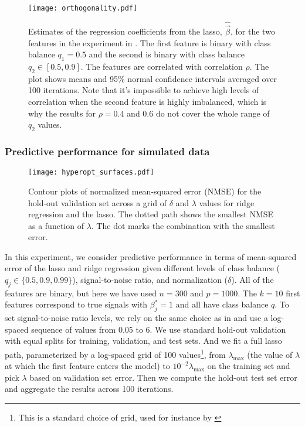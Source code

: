 \begin{figure}[htpb]
  \centering
  \texttt{[image: orthogonality.pdf]}
  \caption{%
    Estimates of the regression coefficients from the lasso,
    \(\hat{\vec{\beta}}\), for the two features in the experiment in
    . The first feature is binary with class
    balance \(q_1 = 0.5\) and the second is binary with class balance \(q_2 \in [0.5, 0.9]\).
    The features are correlated with correlation \(\rho\). The plot shows means and
    95\% normal confidence intervals averaged over 100 iterations. Note
    that it's impossible to achieve high levels of correlation when the second
    feature is highly imbalanced, which is why the results for \(\rho = 0.4\) and \(0.6\)
    do not cover the whole range of \(q_2\) values.
  }
  \label{fig:orthogonality}
\end{figure}

\subsubsection{Predictive performance for simulated data}%
\label{sec:predictive-performance-simulated}

\begin{figure}[htpb]
  \centering
  \texttt{[image: hyperopt\_surfaces.pdf]}
  \caption{%
    Contour plots of normalized mean-squared error (NMSE) for the hold-out validation set
    across a grid of \(\delta\) and \(\lambda\) values for ridge regression and the lasso. The
    dotted path shows the smallest NMSE as a function of \(\lambda\). The dot marks the
    combination with the smallest error.
  }
  \label{fig:hyperopt-contours-full}
\end{figure}

In this experiment, we consider predictive performance in terms of mean-squared error of
the lasso and ridge regression given different levels of class balance (\(q_j \in \{0.5,
0.9, 0.99\}\)), signal-to-noise ratio, and normalization (\(\delta\)). All of the features
are binary, but here we have used \(n=300\) and \(p = \num{1000}\). The \(k=10\) first
features correspond to true signals with \(\beta^*_j = 1\) and all have class balance
\(q\). To set signal-to-noise ratio levels, we rely on the same choice as in
\citet{hastie2020} and use a log-spaced sequence of values from 0.05 to 6. We use
standard hold-out validation with equal splits for training, validation, and test sets. And
we fit a full lasso path, parameterized by a log-spaced grid of 100 values\footnote{This is
  a standard choice of grid, used for instance by \citet{friedman2010}}, from
\(\lambda_\text{max}\) (the value of \(\lambda\) at which the first feature enters the
model) to \(10^{-2}\lambda_\text{max}\) on the training set and pick \(\lambda\) based on
validation set error. Then we compute the hold-out test set error and aggregate the results
across 100 iterations.

